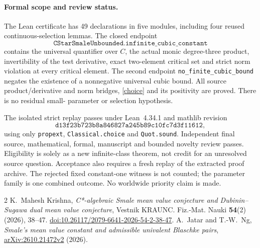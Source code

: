 \documentclass[11pt]{article}
\begin{document}
\paragraph{Formal scope and review status.}
The Lean certificate has 49 declarations in five modules, including four
reused continuous-selection lemmas. The closed endpoint
\[
\texttt{CStarSmaleUnbounded.infinite\_cubic\_constant}
\]
contains the universal quantifier over $C$, the actual monic degree-three
product, invertibility of the test derivative, exact two-element critical
set and strict norm violation at every critical element. The second endpoint
\texttt{no\_finite\_cubic\_bound} negates the existence of a nonnegative
universal cubic bound. All source product/derivative and norm bridges,
\eqref{choice} and its positivity are proved. There is no residual small-
parameter or selection hypothesis.

The isolated strict replay passes under Lean~4.34.1 and mathlib revision
\[\texttt{d13f23b723b8a846827a245b89c10fc7d3f11612},\]
using only \texttt{propext}, \texttt{Classical.choice} and \texttt{Quot.sound}.
Independent final source, mathematical, formal, manuscript and bounded
novelty review passes. Eligibility is solely as a new infinite-class theorem,
not credit for an unresolved source question. Acceptance also requires a fresh
replay of the extracted proof archive. The rejected fixed constant-one witness
is not counted; the parameter family is one combined outcome.
No worldwide priority claim is made.

\begin{thebibliography}{2}
 K.~Mahesh Krishna,
\emph{C*-algebraic Smale mean value conjecture and Dubinin--Sugawa dual mean
value conjecture}, Vestnik KRAUNC. Fiz.-Mat. Nauki \textbf{54}(2) (2026), 38--47.
\href{https://doi.org/10.26117/2079-6641-2026-54-2-38-47}{doi:10.26117/2079-6641-2026-54-2-38-47}.
 A.~Jatar and T.-W.~Ng,
\emph{Smale's mean value constant and admissible univalent Blaschke pairs},
\href{https://arxiv.org/abs/2610.21472v2}{arXiv:2610.21472v2} (2026).
\end{thebibliography}
\end{document}
